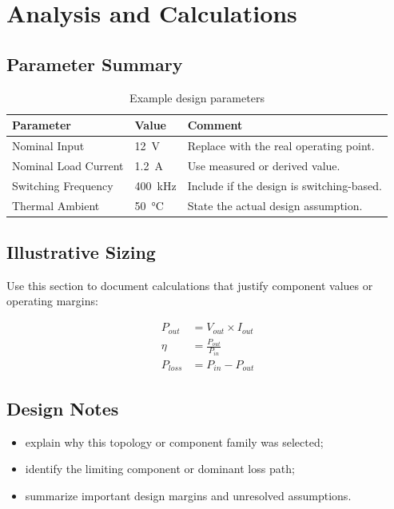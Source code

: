 \section{Analysis and Calculations}

\subsection{Parameter Summary}
\begin{table}[H]
    \centering
    \small
    \begin{tabular}{l l l}
        \toprule
        \textbf{Parameter} & \textbf{Value} & \textbf{Comment} \\
        \midrule
        Nominal Input & \SI{12}{\volt} & Replace with the real operating point. \\
        Nominal Load Current & \SI{1.2}{\ampere} & Use measured or derived value. \\
        Switching Frequency & \SI{400}{\kilo\hertz} & Include if the design is switching-based. \\
        Thermal Ambient & \SI{50}{\celsius} & State the actual design assumption. \\
        \bottomrule
    \end{tabular}
    \caption{Example design parameters}
    \label{tab:parameters}
\end{table}

\subsection{Illustrative Sizing}
Use this section to document calculations that justify component values or
operating margins:

\begin{align}
    P_{out} &= V_{out} \times I_{out} \\
    \eta &= \frac{P_{out}}{P_{in}} \\
    P_{loss} &= P_{in} - P_{out}
\end{align}


\subsection{Design Notes}
\begin{itemize}
    \item explain why this topology or component family was selected;
    \item identify the limiting component or dominant loss path;
    \item summarize important design margins and unresolved assumptions.
\end{itemize}

